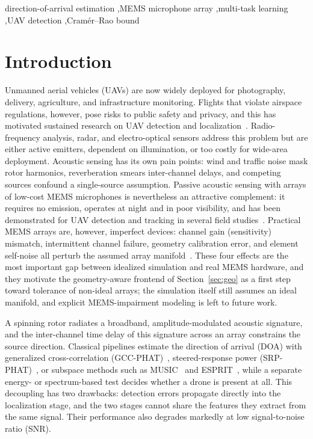 \documentclass[5p,twocolumn]{elsarticle}
\begin{document}
\begin{frontmatter}
\begin{abstract}
\end{abstract}

\begin{keyword}
direction-of-arrival estimation \sep MEMS microphone array \sep multi-task learning \sep UAV detection \sep Cram\'er--Rao bound
\end{keyword}

\end{frontmatter}

\section{Introduction}
\label{sec:intro}
Unmanned aerial vehicles (UAVs) are now widely deployed for photography, delivery, agriculture, and infrastructure monitoring. Flights that violate airspace regulations, however, pose risks to public safety and privacy, and this has motivated sustained research on UAV detection and localization~\cite{taha2019drone}. Radio-frequency analysis, radar, and electro-optical sensors address this problem but are either active emitters, dependent on illumination, or too costly for wide-area deployment. Acoustic sensing has its own pain points: wind and traffic noise mask rotor harmonics, reverberation smears inter-channel delays, and competing sources confound a single-source assumption. Passive acoustic sensing with arrays of low-cost MEMS microphones is nevertheless an attractive complement: it requires no emission, operates at night and in poor visibility, and has been demonstrated for UAV detection and tracking in several field studies~\cite{case2008uav,busset2015acoustic}. Practical MEMS arrays are, however, imperfect devices: channel gain (sensitivity) mismatch, intermittent channel failure, geometry calibration error, and element self-noise all perturb the assumed array manifold~\cite{yan2023mems}. These four effects are the most important gap between idealized simulation and real MEMS hardware, and they motivate the geometry-aware frontend of Section~\ref{sec:geo} as a first step toward tolerance of non-ideal arrays; the simulation itself still assumes an ideal manifold, and explicit MEMS-impairment modeling is left to future work.

A spinning rotor radiates a broadband, amplitude-modulated acoustic signature, and the inter-channel time delay of this signature across an array constrains the source direction. Classical pipelines estimate the direction of arrival (DOA) with generalized cross-correlation (GCC-PHAT)~\cite{knapp1976gcc}, steered-response power (SRP-PHAT)~\cite{dibiase2001srp}, or subspace methods such as MUSIC~\cite{schmidt1986music} and ESPRIT~\cite{roy1989esprit}, while a separate energy- or spectrum-based test decides whether a drone is present at all. This decoupling has two drawbacks: detection errors propagate directly into the localization stage, and the two stages cannot share the features they extract from the same signal. Their performance also degrades markedly at low signal-to-noise ratio (SNR).
\end{document}
